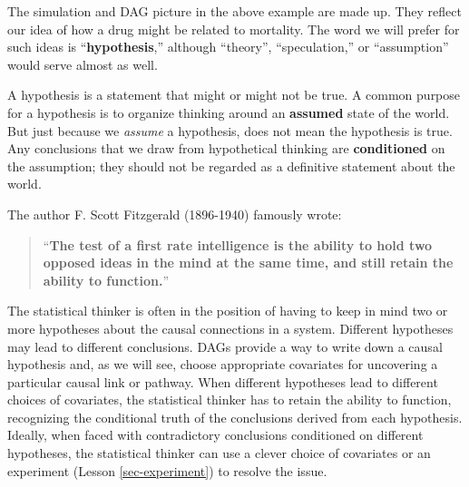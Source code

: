 \documentclass[
  letterpaper,
  DIV=11,
  numbers=noendperiod,
  oneside]{scrartcl}
\begin{document}
\begin{tcolorbox}[enhanced jigsaw, colbacktitle=quarto-callout-note-color!10!white, opacityback=0, breakable, opacitybacktitle=0.6, colback=white, coltitle=black, arc=.35mm, title=\textcolor{quarto-callout-note-color}{\faInfo}\hspace{0.5em}{A DAG is a hypothesis}, left=2mm, colframe=quarto-callout-note-color-frame, rightrule=.15mm, bottomrule=.15mm, leftrule=.75mm, bottomtitle=1mm, toptitle=1mm, titlerule=0mm, toprule=.15mm]

The simulation and DAG picture in the above example are made up. They
reflect our idea of how a drug might be related to mortality. The word
we will prefer for such ideas is ``\textbf{hypothesis},'' although
``theory'', ``speculation,'' or ``assumption'' would serve almost as
well.

A hypothesis is a statement that might or might not be true. A common
purpose for a hypothesis is to organize thinking around an
\textbf{assumed} state of the world. But just because we \emph{assume} a
hypothesis, does not mean the hypothesis is true. Any conclusions that
we draw from hypothetical thinking are \textbf{conditioned} on the
assumption; they should not be regarded as a definitive statement about
the world.

The author F. Scott Fitzgerald (1896-1940) famously wrote:

\begin{quote}
``\textbf{The test of a first rate intelligence is the ability to hold
two opposed ideas in the mind at the same time, and still retain the
ability to function.}''
\end{quote}

The statistical thinker is often in the position of having to keep in
mind two or more hypotheses about the causal connections in a system.
Different hypotheses may lead to different conclusions. DAGs provide a
way to write down a causal hypothesis and, as we will see, choose
appropriate covariates for uncovering a particular causal link or
pathway. When different hypotheses lead to different choices of
covariates, the statistical thinker has to retain the ability to
function, recognizing the conditional truth of the conclusions derived
from each hypothesis. Ideally, when faced with contradictory conclusions
conditioned on different hypotheses, the statistical thinker can use a
clever choice of covariates or an experiment (Lesson
\ref{sec-experiment}) to resolve the issue.

\end{tcolorbox}
\end{document}
